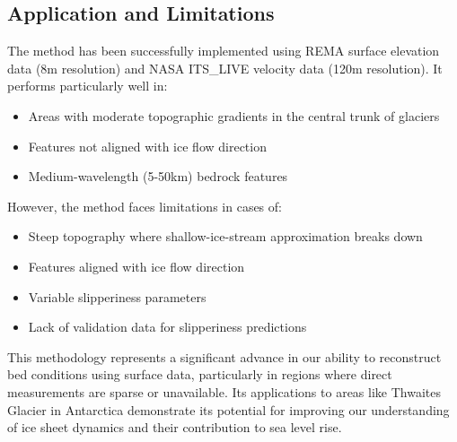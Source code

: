 \subsection*{Application and Limitations}
The method has been successfully implemented using REMA surface elevation data (8m resolution) and NASA ITS\_LIVE velocity data (120m resolution). It performs particularly well in:
\begin{itemize}
\item Areas with moderate topographic gradients in the central trunk of glaciers
\item Features not aligned with ice flow direction
\item Medium-wavelength (5-50km) bedrock features
\end{itemize}
However, the method faces limitations in cases of:
\begin{itemize}
\item Steep topography where shallow-ice-stream approximation breaks down
\item Features aligned with ice flow direction
\item Variable slipperiness parameters
\item Lack of validation data for slipperiness predictions
\end{itemize}
This methodology represents a significant advance in our ability to reconstruct bed conditions using surface data, particularly in regions where direct measurements are sparse or unavailable. Its applications to areas like Thwaites Glacier in Antarctica demonstrate its potential for improving our understanding of ice sheet dynamics and their contribution to sea level rise.

